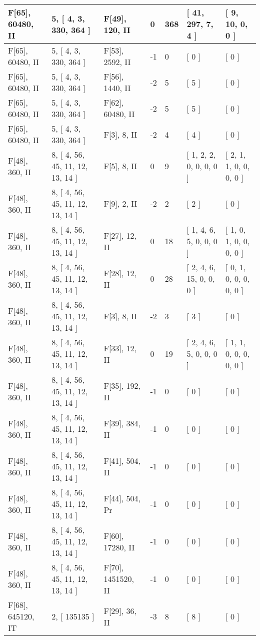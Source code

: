 \documentclass[9 pt]{scrartcl}
\begin{document}
\begin{longtable}{ |p{3em}|p{6em}|p{3em}|p{2em}|p{2em}|p{6em}|p{6em}| }
F[65], 60480, II &5, [ 4, 3, 330, 364 ] & F[49], 120, II  & 0 & 368 & [ 41, 297, 7, 4 ] & [ 9, 10, 0, 0 ]\\ \hline
F[65], 60480, II &5, [ 4, 3, 330, 364 ] & F[53], 2592, II  & -1 & 0 & [ 0 ] & [ 0 ]\\ \hline
F[65], 60480, II &5, [ 4, 3, 330, 364 ] & F[56], 1440, II  & -2 & 5 & [ 5 ] & [ 0 ]\\ \hline
F[65], 60480, II &5, [ 4, 3, 330, 364 ] & F[62], 60480, II  & -2 & 5 & [ 5 ] & [ 0 ]\\ \hline
F[65], 60480, II &5, [ 4, 3, 330, 364 ] & F[3], 8, II  & -2 & 4 & [ 4 ] & [ 0 ]\\ \hline
F[48], 360, II &8, [ 4, 56, 45, 11, 12, 13, 14 ] & F[5], 8, II  & 0 & 9 & [ 1, 2, 2, 0, 0, 0, 0 ] & [ 2, 1, 1, 0, 0, 0, 0 ]\\ \hline
F[48], 360, II &8, [ 4, 56, 45, 11, 12, 13, 14 ] & F[9], 2, II  & -2 & 2 & [ 2 ] & [ 0 ]\\ \hline
F[48], 360, II &8, [ 4, 56, 45, 11, 12, 13, 14 ] & F[27], 12, II  & 0 & 18 & [ 1, 4, 6, 5, 0, 0, 0 ] & [ 1, 0, 1, 0, 0, 0, 0 ]\\ \hline
F[48], 360, II &8, [ 4, 56, 45, 11, 12, 13, 14 ] & F[28], 12, II  & 0 & 28 & [ 2, 4, 6, 15, 0, 0, 0 ] & [ 0, 1, 0, 0, 0, 0, 0 ]\\ \hline
F[48], 360, II &8, [ 4, 56, 45, 11, 12, 13, 14 ] & F[3], 8, II  & -2 & 3 & [ 3 ] & [ 0 ]\\ \hline
F[48], 360, II &8, [ 4, 56, 45, 11, 12, 13, 14 ] & F[33], 12, II  & 0 & 19 & [ 2, 4, 6, 5, 0, 0, 0 ] & [ 1, 1, 0, 0, 0, 0, 0 ]\\ \hline
F[48], 360, II &8, [ 4, 56, 45, 11, 12, 13, 14 ] & F[35], 192, II  & -1 & 0 & [ 0 ] & [ 0 ]\\ \hline
F[48], 360, II &8, [ 4, 56, 45, 11, 12, 13, 14 ] & F[39], 384, II  & -1 & 0 & [ 0 ] & [ 0 ]\\ \hline
F[48], 360, II &8, [ 4, 56, 45, 11, 12, 13, 14 ] & F[41], 504, II  & -1 & 0 & [ 0 ] & [ 0 ]\\ \hline
F[48], 360, II &8, [ 4, 56, 45, 11, 12, 13, 14 ] & F[44], 504, Pr  & -1 & 0 & [ 0 ] & [ 0 ]\\ \hline
F[48], 360, II &8, [ 4, 56, 45, 11, 12, 13, 14 ] & F[60], 17280, II  & -1 & 0 & [ 0 ] & [ 0 ]\\ \hline
F[48], 360, II &8, [ 4, 56, 45, 11, 12, 13, 14 ] & F[70], 1451520, II  & -1 & 0 & [ 0 ] & [ 0 ]\\ \hline
F[68], 645120, IT &2, [ 135135 ] & F[29], 36, II  & -3 & 8 & [ 8 ] & [ 0 ]\\ \hline

\end{longtable}
\end{document}
